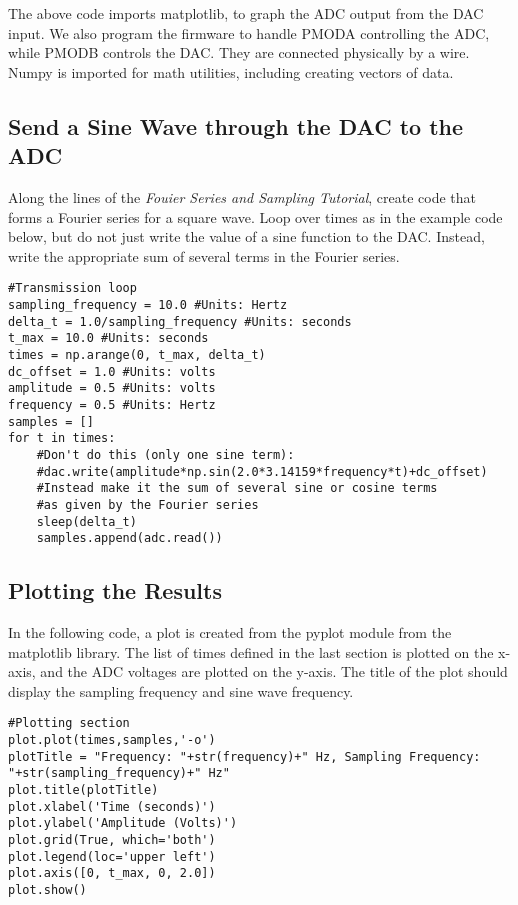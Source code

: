 \documentclass{article}
\begin{document}
The above code imports matplotlib, to graph the ADC output from the DAC input.  We also program the firmware to handle PMODA controlling the ADC, while PMODB controls the DAC.  They are connected physically by a wire.  Numpy is imported for math utilities, including creating vectors of data.

\subsection{Send a Sine Wave through the DAC to the ADC}

Along the lines of the \textit{Fouier Series and Sampling Tutorial}, create code that forms a Fourier series for a square wave.  Loop over times as in the example code below, but do not just write the value of a sine function to the DAC.  Instead, write the appropriate sum of several terms in the Fourier series.

\begin{verbatim}
#Transmission loop
sampling_frequency = 10.0 #Units: Hertz
delta_t = 1.0/sampling_frequency #Units: seconds
t_max = 10.0 #Units: seconds
times = np.arange(0, t_max, delta_t)
dc_offset = 1.0 #Units: volts
amplitude = 0.5 #Units: volts
frequency = 0.5 #Units: Hertz
samples = []
for t in times:
	#Don't do this (only one sine term):
    #dac.write(amplitude*np.sin(2.0*3.14159*frequency*t)+dc_offset)
    #Instead make it the sum of several sine or cosine terms
    #as given by the Fourier series
    sleep(delta_t)
    samples.append(adc.read())
\end{verbatim}

\subsection{Plotting the Results}

In the following code, a plot is created from the pyplot module from the matplotlib library.  The list of times defined in the last section is plotted on the x-axis, and the ADC voltages are plotted on the y-axis.  The title of the plot should display the sampling frequency and sine wave frequency.

\begin{verbatim}
#Plotting section
plot.plot(times,samples,'-o')
plotTitle = "Frequency: "+str(frequency)+" Hz, Sampling Frequency: "+str(sampling_frequency)+" Hz"
plot.title(plotTitle)
plot.xlabel('Time (seconds)')
plot.ylabel('Amplitude (Volts)')
plot.grid(True, which='both') 
plot.legend(loc='upper left')
plot.axis([0, t_max, 0, 2.0])
plot.show()
\end{verbatim}
\end{document}
